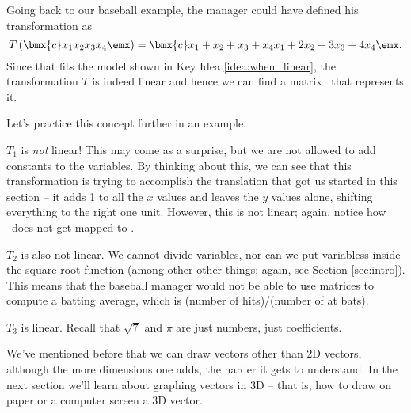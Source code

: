 Going back to our baseball example, the manager could have defined his transformation as $$T\left(\bmx{c}x_1\\x_2\\x_3\\x_4\emx\right) = \bmx{c}x_1+x_2+x_3+x_4 \\ x_1+2x_2+3x_3+4x_4\emx.$$ Since that fits the model shown in Key Idea \ref{idea:when_linear}, the transformation $T$ is indeed linear and hence we can find a matrix \TT\ that represents it.

Let's practice this concept further in an example.\\


{$T_1$ is \textit{not} linear! This may come as a surprise, but we are not allowed to add constants to the variables. By thinking about this, we can see that this transformation is trying to accomplish the translation that got us started in this section -- it adds 1 to all the $x$ values and leaves the $y$ values alone, shifting everything to the right one unit. However, this is not linear; again, notice how \zero\ does not get mapped to \zero.

$T_2$ is also not linear. We cannot divide variables, nor can we put variabless inside the square root function (among other other things; again, see Section \ref{sec:intro}). This means that the baseball manager would not be able to use matrices to compute a batting average, which is (number of hits)/(number of at bats).

$T_3$ is linear. Recall that $\sqrt{7}$ and $\pi$ are just numbers, just coefficients.
}

We've mentioned before that we can draw vectors other than 2D vectors, although the more dimensions one adds, the harder it gets to understand. In the next section we'll learn about graphing vectors in 3D -- that is, how to draw on paper or a computer screen a 3D vector.\\





